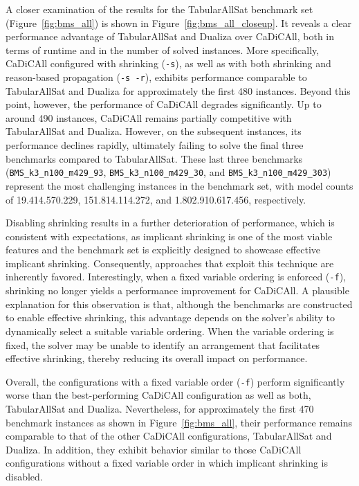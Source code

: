 \documentclass[12pt,a4paper]{article}
\begin{document}
A closer examination of the results for the TabularAllSat benchmark set (Figure~\ref{fig:bms_all}) is shown in Figure~\ref{fig:bms_all_closeup}. It reveals a clear performance advantage of TabularAllSat and Dualiza over CaDiCAll, both in terms of runtime and in the number of solved instances. More specifically, CaDiCAll configured with shrinking (\verb|-s|), as well as with both shrinking and reason-based propagation (\verb|-s -r|), exhibits performance comparable to TabularAllSat and Dualiza for approximately the first 480 instances. Beyond this point, however, the performance of CaDiCAll degrades significantly. Up to around 490 instances, CaDiCAll remains partially competitive with TabularAllSat and Dualiza. However, on the subsequent instances, its performance declines rapidly, ultimately failing to solve the final three benchmarks compared to TabularAllSat. These last three benchmarks (\verb|BMS_k3_n100_m429_93|, \verb|BMS_k3_n100_m429_30|, and \verb|BMS_k3_n100_m429_303|) represent the most challenging instances in the benchmark set, with model counts of 19.414.570.229, 151.814.114.272, and 1.802.910.617.456, respectively.

Disabling shrinking results in a further deterioration of performance, which is consistent with expectations, as implicant shrinking is one of the most viable features and the benchmark set is explicitly designed to showcase effective implicant shrinking. Consequently, approaches that exploit this technique are inherently favored. Interestingly, when a fixed variable ordering is enforced (\verb|-f|), shrinking no longer yields a performance improvement for CaDiCAll. A plausible explanation for this observation is that, although the benchmarks are constructed to enable effective shrinking, this advantage depends on the solver's ability to dynamically select a suitable variable ordering. When the variable ordering is fixed, the solver may be unable to identify an arrangement that facilitates effective shrinking, thereby reducing its overall impact on performance.

Overall, the configurations with a fixed variable order (\verb|-f|) perform significantly worse than the best-performing CaDiCAll configuration as well as both, TabularAllSat and Dualiza. Nevertheless, for approximately the first 470 benchmark instances as shown in Figure~\ref{fig:bms_all}, their performance remains comparable to that of the other CaDiCAll configurations, TabularAllSat and Dualiza. In addition, they exhibit behavior similar to those CaDiCAll configurations without a fixed variable order in which implicant shrinking is disabled.
\end{document}
